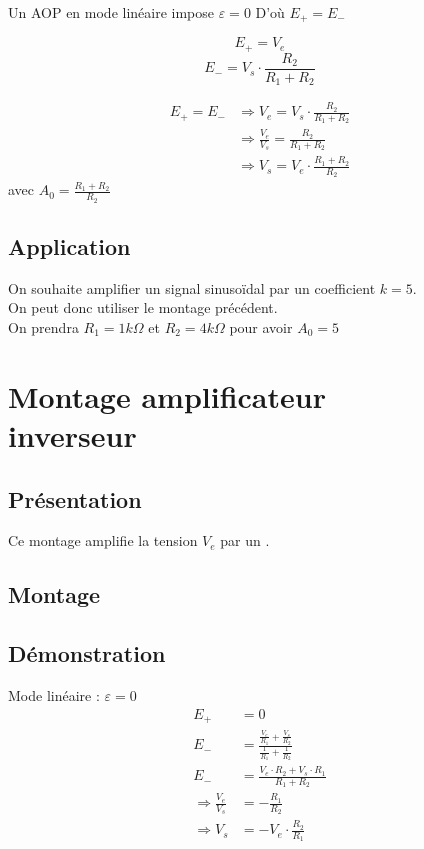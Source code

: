 Un AOP en mode linéaire impose $\varepsilon=0$
D'où $E_+ =E_-$ 

$$E_+=V_e$$
$$E_-=V_s \cdot \frac{R_2}{R_1+R_2}$$

\begin{align}
E_+ = E_- &\Rightarrow V_e = V_s \cdot \frac{R_2}{R_1+R_2}\\
 &\Rightarrow \frac{V_e}{V_s} = \frac{R_2}{R_1+R_2}\\
 &\Rightarrow V_s = V_e \cdot \frac{R_1+R_2}{R_2}
\end{align}
avec $A_0=\frac{R_1+R_2}{R_2}$

\section{Application}

\begin{exemple}
On souhaite amplifier un signal sinusoïdal par un coefficient $k=5$.\\
On peut donc utiliser le montage précédent. \\
On prendra $R_1=1 k\Omega$ et $R_2=4k\Omega$ pour avoir $A_0=5$
\end{exemple}





\chapter{Montage amplificateur \\inverseur}
\section{Présentation}

Ce montage amplifie la tension $V_e$ par un .

\section{Montage}


\section{Démonstration}

Mode linéaire : $\varepsilon = 0$
\begin{align}
E_+&=0 \\
E_-&= \frac{ \frac{V_e}{R_1}+\frac{V_s}{R_2} } { \frac{1}{R_1} + \frac{1}{R_2}} \\
E_-&=\frac{V_e \cdot R_2 + V_s \cdot R_1}{R_1 + R_2} \\
\Rightarrow \frac{V_e}{V_s} &= -\frac{R_1}{R_2}\\
\Rightarrow V_s &= -V_e \cdot \frac{R_2}{R_1} 
\end{align}

